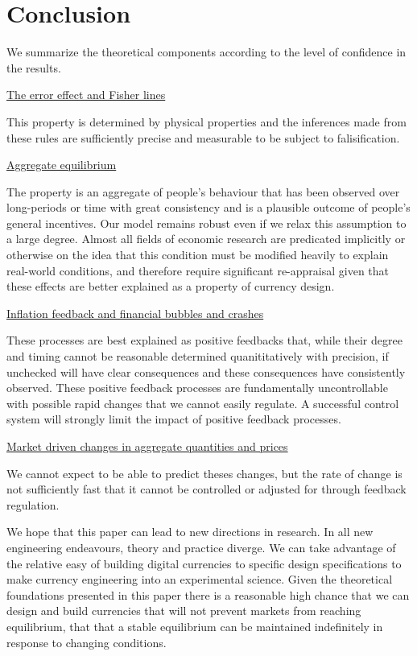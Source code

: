 \section{Conclusion}
\label{section:conclusion}

We summarize the theoretical components according to the level of confidence in the results.

\underline{The error effect and Fisher lines}

This property is determined by physical properties and the inferences made from these rules are
sufficiently precise and measurable to be subject to falisification.

\underline{Aggregate equilibrium}

The property is an aggregate of people's behaviour that has been observed over long-periods or time with
great consistency and is a plausible outcome of people's general incentives. Our model remains
robust even if we relax this assumption to a large degree. Almost all fields of economic research
are predicated implicitly or otherwise on the idea that this condition must be modified heavily to
explain real-world conditions, and therefore require significant re-appraisal given that these
effects are better explained as a property of currency design.

\underline{Inflation feedback and financial bubbles and crashes}

These processes are best explained as positive feedbacks that, while their degree and timing cannot
be reasonable determined quanititatively with precision, if unchecked will have clear consequences
and these consequences have consistently observed. These positive feedback processes are
fundamentally uncontrollable with possible rapid changes that we cannot easily regulate. A
successful control system will strongly limit the impact of positive feedback processes.

\underline{Market driven changes in aggregate quantities and prices}

We cannot expect to be able to predict theses changes, but the rate of change is not sufficiently
fast that it cannot be controlled or adjusted for through feedback regulation.

We hope that this paper can lead to new directions in research. In all new engineering endeavours,
theory and practice diverge. We can take advantage of the relative easy of building digital
currencies to specific design specifications to make currency engineering into an experimental
science. Given the theoretical foundations presented in this paper there is a reasonable high chance
that we can design and build currencies that will not prevent markets from reaching equilibrium,
that that a stable equilibrium can be maintained indefinitely in response to changing conditions. 
